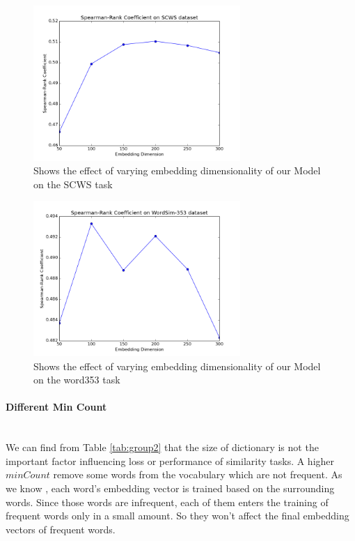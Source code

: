 \begin{figure}[!ht]
  \centering
	\includegraphics[width=0.7\textwidth]{vecSCWS} 
	\caption{Shows the effect of varying embedding dimensionality of our Model on the SCWS task}
	\label{fig:vecSCWS}
\end{figure}


\begin{figure}[tb]
  \centering
	\includegraphics[width=0.7\textwidth]{vecword353} 
	\caption{Shows the effect of varying embedding dimensionality of our Model on the word353 task}
	\label{fig:vecword353}
\end{figure}




\paragraph{Different Min Count} \ \\
We can find from Table \ref{tab:group2} that the size of dictionary is not the important factor influencing loss or performance of similarity tasks. A higher $minCount$ remove some words from the vocabulary which are not frequent. As we know , each word's embedding vector is trained based on the surrounding words. Since those words are infrequent, each of them enters the training of frequent words only in a small amount. So they won't affect the final embedding vectors of frequent words.

